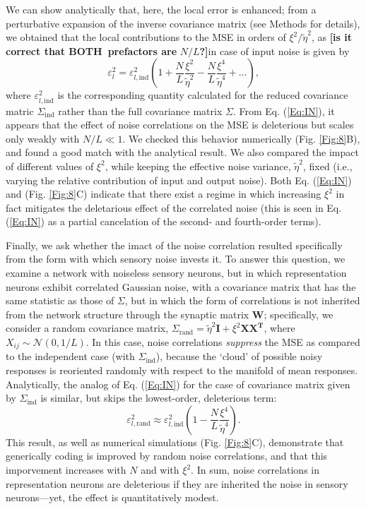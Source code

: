 \documentclass[a4paper]{article}%
\begin{document}
We can show analytically that, here, the local error is enhanced; from a
perturbative expansion of the inverse covariance matrix (see Methods for
details), we obtained that the local contributions to the MSE in orders of
$\xi^{2}/\tilde{\eta}^{2}$, as \textbf{[is it correct that BOTH\ prefactors
are }$N/L$\textbf{?]}in case of input noise is given by
\begin{equation}
\varepsilon_{l}^{2}=\varepsilon_{l,\text{ind}}^{2}\left(  1+\frac{N}{L}%
\frac{\xi^{2}}{\tilde{\eta}^{2}}-\frac{N}{L}\frac{\xi^{4}}{\tilde{\eta}^{4}%
}+\ldots\right)  ,\label{Eq:IN}%
\end{equation}
where $\varepsilon_{l,\text{ind}}^{2}$ is the corresponding quantity
calculated for the reduced covariance matric $\Sigma_{\text{ind}}$ rather than
the full covariance matrix $\Sigma$. From Eq. (\ref{Eq:IN}), it appears that
the effect of noise correlations on the MSE is deleterious but scales only
weakly with $N/L\ll1$. We checked this behavior numerically (Fig.
\ref{Fig:8}B), and found a good match with the analytical result. We also
compared the impact of different values of $\xi^{2}$, while keeping the
effective noise variance, $\tilde{\eta}^{2}$, fixed (i.e., varying the
relative contribution of input and output noise). Both Eq. (\ref{Eq:IN}) and
(Fig. \ref{Fig:8}C) indicate that there exist a regime in which increasing
$\xi^{2}$ in fact mitigates the deletarious effect of the correlated noise
(this is seen in Eq. (\ref{Eq:IN}) as a partial cancelation of the second- and
fourth-order terms).

Finally, we ask whether the imact of the noise correlation resulted
specifically from the form with which sensory noise invests it. To answer this
question, we examine a network with noiseless sensory neurons, but in which
representation neurons exhibit correlated Gaussian noise, with a covariance
matrix that has the same statistic as those of $\Sigma$, but in which the form
of correlations is not inherited from the network structure through the
synaptic matrix $\mathbf{W}$; specifically, we consider a random covariance
matrix, $\Sigma_{\text{rand}}=\tilde{\eta}^{2}\mathbf{I}+\xi^{2}%
\mathbf{XX^{T}}$, where $X_{ij}\sim\mathcal{N}(0,1/L)$. In this case, noise
correlations \textit{suppress} the MSE as compared to the independent case
(with $\Sigma_{\text{ind}}$), because the `cloud' of possible noisy responses
is reoriented randomly with respect to the manifold of mean responses.
Analytically, the analog of Eq. (\ref{Eq:IN}) for the case of covariance
matrix given by $\Sigma_{\text{ind}}$ is similar, but skips the lowest-order,
deleterious term:
\begin{equation}
\varepsilon_{l,\text{rand}}^{2}\approx\varepsilon_{l,\text{ind}}^{2}\left(
1-\frac{N}{L}\frac{\xi^{4}}{\tilde{\eta}^{4}}\right)  .\label{Eq:Rand}%
\end{equation}
This result, as well as numerical simulations (Fig. \ref{Fig:8}C), demonstrate
that generically coding is improved by random noise correlations, and that
this imporvement increases with $N$ and with $\xi^{2}$. In sum, noise
correlations in representation neurons are deleterious if they are inherited
the noise in sensory neurons---yet, the effect is quantitatively modest.
\end{document}

